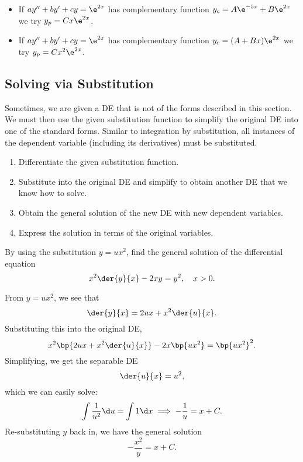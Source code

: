 \begin{example}[Adjusting $y_p$]
    \phantom{.}
    \begin{itemize}
        \item If $a y'' + by' + cy = \e^{2x}$ has complementary function $y_c = A\e^{-5x} + B\e^{2x}$ we try $y_p = Cx\e^{2x}$.
        \item If $a y'' + by' + cy = \e^{2x}$ has complementary function $y_c = (A + Bx) \e^{2x}$ we try $y_p = Cx^2\e^{2x}$.
    \end{itemize}
\end{example}

\subsection{Solving via Substitution}

Sometimes, we are given a DE that is not of the forms described in this section. We must then use the given substitution function to simplify the original DE into one of the standard forms. Similar to integration by substitution, all instances of the dependent variable (including its derivatives) must be substituted.

\begin{recipe}
    \phantom{.}
    \renewcommand{\theenumi}{\arabic{enumi}.}
    \begin{enumerate}
        \item Differentiate the given substitution function.
        \item Substitute into the original DE and simplify to obtain another DE that we know how to solve.
        \item Obtain the general solution of the new DE with new dependent variables.
        \item Express the solution in terms of the original variables.
    \end{enumerate}
    \renewcommand{\theenumi}{(\alph{enumi})}
\end{recipe}

\begin{sample}
    By using the substitution $y = ux^2$, find the general solution of the differential equation \[x^2 \der{y}{x} - 2xy = y^2, \quad x > 0.\]
\end{sample}
\begin{sampans}
    From $y = ux^2$, we see that \[\der{y}{x} = 2ux + x^2 \der{u}{x}.\] Substituting this into the original DE, \[x^2 \bp{2ux + x^2 \der{u}{x}} - 2x \bp{ux^2} = \bp{ux^2}^2.\] Simplifying, we get the separable DE \[\der{u}{x} = u^2,\] which we can easily solve: \[\int \frac1{u^2} \d u = \int 1 \d x \implies -\frac1{u} = x + C.\] Re-substituting $y$ back in, we have the general solution \[-\frac{x^2}{y} = x + C.\]
\end{sampans}

